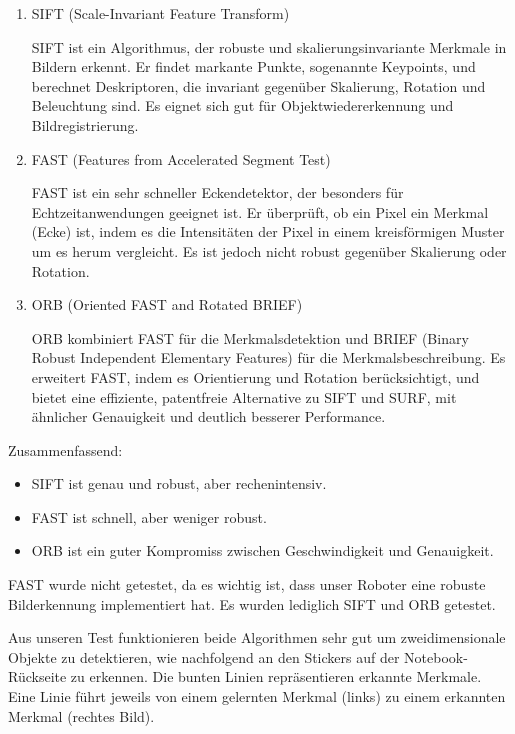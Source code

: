 \begin{enumerate}
    \item SIFT (Scale-Invariant Feature Transform)
    
    SIFT ist ein Algorithmus, der robuste und skalierungsinvariante Merkmale in Bildern erkennt. Er findet markante Punkte, sogenannte Keypoints, und berechnet Deskriptoren, die invariant gegenüber Skalierung, Rotation und Beleuchtung sind. Es eignet sich gut für Objektwiedererkennung und Bildregistrierung.

    \item FAST (Features from Accelerated Segment Test)
    
    FAST ist ein sehr schneller Eckendetektor, der besonders für Echtzeitanwendungen geeignet ist. Er überprüft, ob ein Pixel ein Merkmal (Ecke) ist, indem es die Intensitäten der Pixel in einem kreisförmigen Muster um es herum vergleicht. Es ist jedoch nicht robust gegenüber Skalierung oder Rotation.

    \item ORB (Oriented FAST and Rotated BRIEF)
    
    ORB kombiniert FAST für die Merkmalsdetektion und BRIEF (Binary Robust Independent Elementary Features) für die Merkmalsbeschreibung. Es erweitert FAST, indem es Orientierung und Rotation berücksichtigt, und bietet eine effiziente, patentfreie Alternative zu SIFT und SURF, mit ähnlicher Genauigkeit und deutlich besserer Performance.
\end{enumerate}

Zusammenfassend:

\begin{itemize}
    \item SIFT ist genau und robust, aber rechenintensiv.
    \item FAST ist schnell, aber weniger robust.
    \item ORB ist ein guter Kompromiss zwischen Geschwindigkeit und Genauigkeit.
\end{itemize}

FAST wurde nicht getestet, da es wichtig ist, dass unser Roboter eine robuste Bilderkennung implementiert hat. Es wurden lediglich SIFT und ORB getestet.

Aus unseren Test funktionieren beide Algorithmen sehr gut um zweidimensionale Objekte zu detektieren, wie nachfolgend an den Stickers auf der Notebook-Rückseite zu erkennen. Die bunten Linien repräsentieren erkannte Merkmale. Eine Linie führt jeweils von einem gelernten Merkmal (links) zu einem erkannten Merkmal (rechtes Bild).

